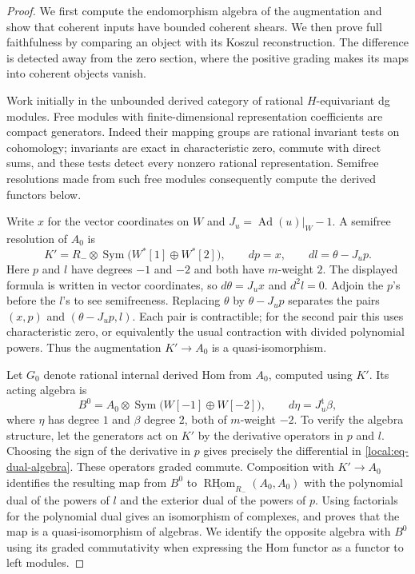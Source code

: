 \documentclass[11pt]{article}
\numberwithin{equation}{section}
\theoremstyle{definition}
\theoremstyle{remark}
\newcommand{\Ad}{\operatorname{Ad}}
\newcommand{\RHom}{\operatorname{RHom}}
\newcommand{\Sym}{\operatorname{Sym}}
\begin{document}
\begin{proof}
We first compute the endomorphism algebra of the augmentation and show
that coherent inputs have bounded coherent shears.  We then prove
full faithfulness by comparing an object with its Koszul reconstruction.
The difference is detected away from the zero section, where the
positive grading makes its maps into coherent objects vanish.

Work initially in the unbounded derived category of rational
$H$-equivariant dg modules.  Free modules with finite-dimensional
representation coefficients are compact generators.  Indeed their
mapping groups are rational invariant tests on cohomology; invariants
are exact in characteristic zero, commute with direct sums, and these
tests detect every nonzero rational representation.  Semifree
resolutions made from such free modules consequently compute the
derived functors below.

Write $x$ for the vector coordinates on $W$ and
$J_u=\Ad(u)|_W-1$.  A semifree resolution of $A_0$ is
\begin{equation}\label{local:eq-augmentation-resolution}
 K'=R_-\otimes\Sym\bigl(W^*[1]\oplus W^*[2]\bigr),
 \qquad dp=x,\qquad dl=\theta-J_up.
\end{equation}
Here $p$ and $l$ have degrees $-1$ and $-2$ and both have $m$-weight
$2$.  The displayed formula is written in vector coordinates, so
$d\theta=J_ux$ and $d^2l=0$.  Adjoin the $p$'s before the $l$'s to
see semifreeness.  Replacing $\theta$ by $\theta-J_up$ separates the
pairs $(x,p)$ and $(\theta-J_up,l)$.  Each pair is contractible;
for the second pair this uses characteristic zero, or equivalently
the usual contraction with divided polynomial powers.  Thus the
augmentation $K'\to A_0$ is a quasi-isomorphism.

Let $G_0$ denote rational internal derived Hom from $A_0$, computed
using $K'$.  Its acting algebra is
\begin{equation}\label{local:eq-dual-algebra}
 B^0=A_0\otimes\Sym\bigl(W[-1]\oplus W[-2]\bigr),
 \qquad d\eta=J_u^{\mathrm t}\beta,
\end{equation}
where $\eta$ has degree $1$ and $\beta$ degree $2$, both of
$m$-weight $-2$.  To verify the algebra structure, let the generators
act on $K'$ by the derivative operators in $p$ and $l$.  Choosing
the sign of the derivative in $p$ gives precisely the differential
in \eqref{local:eq-dual-algebra}.  These operators graded commute.
Composition with $K'\to A_0$ identifies the resulting map from
$B^0$ to $\underline{\RHom}_{R_-}(A_0,A_0)$ with the polynomial
dual of the powers of $l$ and the exterior dual of the powers of $p$.
Using factorials for the polynomial dual gives an isomorphism of
complexes, and proves that the map is a quasi-isomorphism of algebras.
We identify the opposite algebra with $B^0$ using its graded
commutativity when expressing the Hom functor as a functor to left
modules.


\end{proof}
\end{document}
